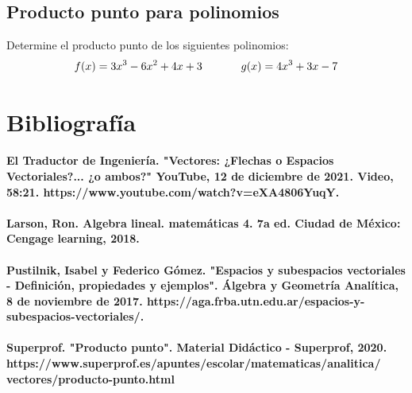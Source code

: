 \documentclass{article}
\begin{document}
    \subsection{Producto punto para polinomios}

        Determine el producto punto de los siguientes polinomios:
        \begin{gather*}
            f(x) = 3x^3 - 6x^2 + 4x + 3 \hspace*{35 pt}
            g(x) = 4x^3 + 3x - 7
        \end{gather*}

\pagebreak
    
\section*{Bibliografía}
    
    \paragraph{El Traductor de Ingeniería. "Vectores: ¿Flechas o Espacios Vectoriales?... ¿o ambos?" YouTube, 12 de diciembre de 2021. Video, 58:21. https://www.youtube.com/watch?v=eXA4806YuqY.}
    
    \paragraph{Larson, Ron. Algebra lineal. matemáticas 4. 7a ed. Ciudad de México: Cengage learning, 2018.}
    
    \paragraph{Pustilnik, Isabel y Federico Gómez. "Espacios y subespacios vectoriales - Definición, propiedades y ejemplos". Álgebra y Geometría Analítica, 8 de noviembre de 2017. https://aga.frba.utn.edu.ar/espacios-y-subespacios-vectoriales/.}
    
    \paragraph{Superprof. "Producto punto". Material Didáctico - Superprof, 2020. https://www.superprof.es/apuntes/escolar/matematicas/analitica/\\
    vectores/producto-punto.html}
    
\end{document}
